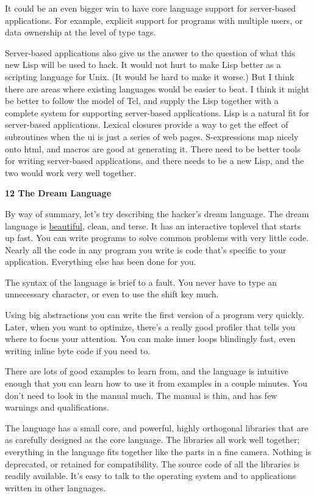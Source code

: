 \documentclass[12pt]{book}
\begin{document}
It could be an even bigger win to have core language support for
server-based applications. For example, explicit support for programs
with multiple users, or data ownership at the level of type tags.

Server-based applications also give us the answer to the question of
what this new Lisp will be used to hack. It would not hurt to make Lisp
better as a scripting language for Unix. (It would be hard to make it
worse.) But I think there are areas where existing languages would be
easier to beat. I think it might be better to follow the model of Tcl,
and supply the Lisp together with a complete system for supporting
server-based applications. Lisp is a natural fit for server-based
applications. Lexical closures provide a way to get the effect of
subroutines when the ui is just a series of web pages. S-expressions map
nicely onto html, and macros are good at generating it. There need to be
better tools for writing server-based applications, and there needs to
be a new Lisp, and the two would work very well together.

\textbf{12 The Dream Language}

By way of summary, let's try describing the hacker's dream language. The
dream language is \href{taste.html}{beautiful}, clean, and terse. It has
an interactive toplevel that starts up fast. You can write programs to
solve common problems with very little code. Nearly all the code in any
program you write is code that's specific to your application.
Everything else has been done for you.

The syntax of the language is brief to a fault. You never have to type
an unnecessary character, or even to use the shift key much.

Using big abstractions you can write the first version of a program very
quickly. Later, when you want to optimize, there's a really good
profiler that tells you where to focus your attention. You can make
inner loops blindingly fast, even writing inline byte code if you need
to.

There are lots of good examples to learn from, and the language is
intuitive enough that you can learn how to use it from examples in a
couple minutes. You don't need to look in the manual much. The manual is
thin, and has few warnings and qualifications.

The language has a small core, and powerful, highly orthogonal libraries
that are as carefully designed as the core language. The libraries all
work well together; everything in the language fits together like the
parts in a fine camera. Nothing is deprecated, or retained for
compatibility. The source code of all the libraries is readily
available. It's easy to talk to the operating system and to applications
written in other languages.
\end{document}
